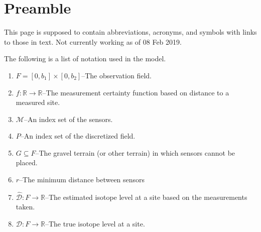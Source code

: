 \documentclass[12pt]{article}
\newcommand{\hcD}{\widehat{\mathcal{D}}}
\newcommand{\cD}{\mathcal{D}}
\newcommand{\cM}{\mathcal{M}}
\begin{document}
	\section*{Preamble}
	This page is supposed to contain abbreviations, acronyms, and symbols with links to those in text.  Not currently working as of 08 Feb 2019.
	
	\par \noindent
	The following is a list of notation used in the model.
	\begin{enumerate}
		\item $F = [0, b_{1}] \times [0, b_{2}]$--The observation field.
		\item $f:\mathbb{R} \to \mathbb{R}$--The measurement certainty function based on distance to a measured site.
		\item $\cM$--An index set of the sensors.
		\item $P$--An index set of the discretized field.
		\item $G \subseteq F$--The gravel terrain (or other terrain) in which sensors cannot be placed.
		\item $r$--The minimum distance between sensors
		\item $\hcD: F \to \mathbb{R}$--The estimated isotope level at a site based on the measurements taken.
		\item $\cD: F \to \mathbb{R}$--The true isotope level at a site.
	\end{enumerate}
	
	\thispagestyle{empty}
	

	\newpage
	
	
	
	
	

\newpage
\printbibliography[heading=bibintoc]
\end{document}
